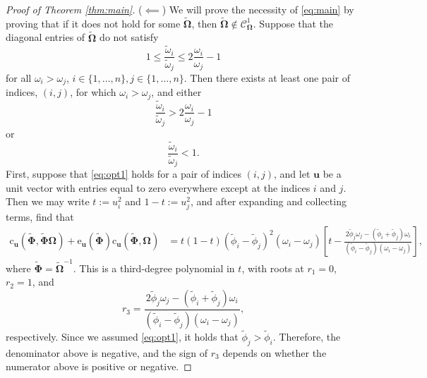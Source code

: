 \documentclass[12pt]{article}
\newcommand{\bl}[1]{{\mathbf #1}}
\newcommand{\bs}[1]{\boldsymbol #1}
\begin{document}
\begin{proof}[Proof of Theorem \ref{thm:main}]
($\impliedby$) We will prove the necessity of \eqref{eq:main} by proving that if it does not hold for some $\tilde{\bs{\Omega}}$, then $\tilde{\bs{\Omega}} \notin \mathcal{C}^1_{\bs{\Omega}}$. Suppose that the diagonal entries of $\tilde{\bs{\Omega}}$ do not satisfy
\begin{equation*}
    1 \leq \frac{\tilde{\omega}_i}{\tilde{\omega}_j} \leq 2\frac{\omega_i}{\omega_j} - 1
\end{equation*}
for all $\omega_i > \omega_j$, $i \in \{1, \dots, n\}, j \in \{1, \dots, n\}$. Then there exists at least one pair of indices, $(i,j)$, for which $\omega_i > \omega_j$, and either
\begin{equation}\label{eq:opt1}
    \frac{\tilde{\omega}_i}{\tilde{\omega}_j} > 2\frac{\omega_i}{\omega_j} - 1
\end{equation}
or
\begin{equation}\label{eq:opt2}
    \frac{\tilde{\omega}_i}{\tilde{\omega}_j} < 1.
\end{equation}
First, suppose that \eqref{eq:opt1} holds for a pair of indices $(i,j)$, and let $\bl{u}$ be a unit vector with entries equal to zero everywhere except at the indices $i$ and $j$. Then we may write $t := u_i^2$ and $1-t := u_j^2$, and after expanding and collecting terms, find that
\begin{equation*}
\begin{aligned}
    \mathrm{c}_{\bl{u}}(\tilde{\boldsymbol{\Phi}}, \tilde{\boldsymbol{\Phi}} \bs{\Omega}) + \mathrm{e}_{\bl{u}}(\tilde{\boldsymbol{\Phi}}) \mathrm{c}_{\bl{u}}(\tilde{\boldsymbol{\Phi}}, \bs{\Omega}) &= t(1-t)(\tilde{\phi}_i - \tilde{\phi}_j)^2 (\omega_i - \omega_j)\left[ t - \frac{2 \tilde{\phi}_j \omega_j - (\tilde{\phi}_i + \tilde{\phi}_j)\omega_i}{(\tilde{\phi}_i - \tilde{\phi}_j)(\omega_i - \omega_j)}\right],
\end{aligned}
\end{equation*}
where $\tilde{\bs{\Phi}} = \tilde{\bs{\Omega}}^{-1}$. This is a third-degree polynomial in $t$, with roots at $r_1=0$, $r_2=1$, and 
\begin{equation}\label{eq:thirdroot}
    r_3 = \frac{2 \tilde{\phi}_j \omega_j - (\tilde{\phi}_i + \tilde{\phi}_j)\omega_i}{(\tilde{\phi}_i - \tilde{\phi}_j)(\omega_i - \omega_j)},
\end{equation}
respectively. Since we assumed \eqref{eq:opt1}, it holds that $\tilde{\phi}_j > \tilde{\phi}_i$. Therefore, the denominator above is negative, and the sign of $r_3$ depends on whether the numerator above is positive or negative. 
    

\end{proof}
\end{document}
